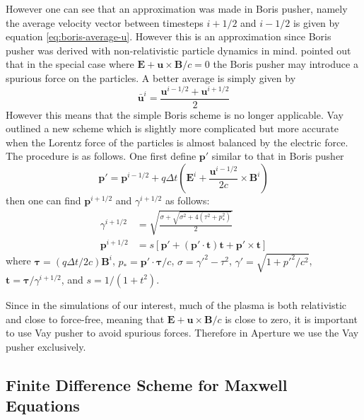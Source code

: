 However one can see that an approximation was made in Boris pusher, namely the
average velocity vector between timesteps $i+1/2$ and $i-1/2$ is given by
equation \eqref{eq:boris-average-u}. However this is an approximation since
Boris pusher was derived with non-relativistic particle dynamics in mind.
\citet{vay_simulation_2008} pointed out that in the special case where
$\mathbf{E} + \mathbf{u}\times \mathbf{B}/c = 0$ the Boris pusher may introduce a
spurious force on the particles. A better average is simply given by
\begin{equation}
  \label{eq:vay-average-u}
  \bar{\mathbf{u}}^i = \frac{\mathbf{u}^{i-1/2} + \mathbf{u}^{i+1/2}}{2}
\end{equation}
However this means that the simple Boris scheme is no longer applicable. Vay
outlined a new scheme which is slightly more complicated but more accurate when
the Lorentz force of the particles is almost balanced by the electric force. The
procedure is as follows. One first define $\mathbf{p}'$ similar to that in Boris
pusher
\begin{equation}
  \label{eq:vay-p-prime}
  \mathbf{p}' = \mathbf{p}^{i-1/2} + q\Delta t\left( \mathbf{E}^i + \frac{\mathbf{u}^{i-1/2}}{2c}\times \mathbf{B}^i \right)
\end{equation}
then one can find $\mathbf{p}^{i+1/2}$ and $\gamma^{i+1/2}$ as follows:
\begin{align}
  \label{eq:vay-solution}
  \gamma^{i+1/2} &= \sqrt{\frac{\sigma + \sqrt{\sigma^2 + 4(\tau^2 + p_{*}^2)}}{2}} \\
  \mathbf{p}^{i+1/2} &= s \left[ \mathbf{p}' + (\mathbf{p}'\cdot \mathbf{t})\mathbf{t} + \mathbf{p}'\times \mathbf{t} \right]
\end{align}
where $\bm{\tau} = (q\Delta t/2c)\mathbf{B}^i$, $p_{*}=\mathbf{p}'\cdot\bm{\tau}/c$,
$\sigma = \gamma'^2-\tau^2$, $\gamma' = \sqrt{1 + p'^2/c^2}$, $\mathbf{t} =
\bm{\tau}/\gamma^{i+1/2}$, and $s = 1/(1 + t^2)$.

Since in the simulations of our interest, much of the plasma is both
relativistic and close to force-free, meaning that $\mathbf{E} +
\mathbf{u}\times \mathbf{B}/c$ is close to zero, it is important to use Vay
pusher to avoid spurious forces. Therefore in Aperture we use the Vay pusher
exclusively.

\subsection{Finite Difference Scheme for Maxwell Equations}
\label{sec:fd-maxwell}

